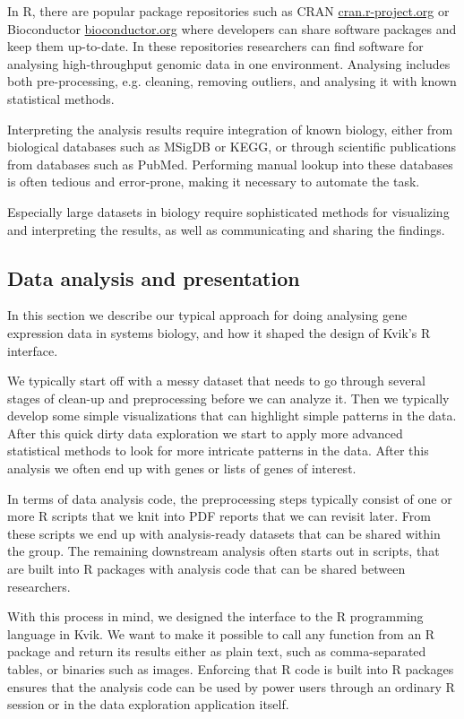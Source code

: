 In R, there are popular package repositories such as CRAN
\url{cran.r-project.org} or Bioconductor \url{bioconductor.org} where developers
can share software packages and keep them up-to-date. In these repositories
researchers can find software for analysing high-throughput genomic data in one
environment. Analysing includes both pre-processing, e.g. cleaning, removing
outliers, and analysing it with known statistical methods.

Interpreting the analysis results require integration of known biology, either
from biological databases such as MSigDB\cite{} or KEGG\cite{}, or through
scientific publications from databases such as PubMed\cite{}. Performing manual
lookup into these databases is often tedious and error-prone, making it
necessary to automate the task. %

Especially large datasets in biology require sophisticated methods for
visualizing and interpreting the results, as well as communicating and sharing
the findings.

\subsection*{Data analysis and presentation} 
In this section we describe our typical approach for doing analysing gene
expression data in systems biology, and how it shaped the design of Kvik's
R interface. 

We typically start off with a messy dataset that needs to go through
several stages of clean-up and preprocessing before we can analyze it. Then we
typically develop some simple visualizations that can highlight simple patterns
in the data. After this quick dirty data exploration we start to apply more
advanced statistical methods to look for more intricate patterns in the data.
After this analysis we often end up with genes or lists of genes of interest. 

In terms of data analysis code, the preprocessing steps typically consist of
one or more R scripts that we knit \cite{knitr} into PDF reports that we can
revisit later. From these scripts we end up with analysis-ready datasets that
can be shared within the group. The remaining downstream analysis often starts
out in scripts, that are built into R packages with analysis code that can be
shared between researchers. 

With this process in mind, we designed the interface to the R programming
language in Kvik. We want to make it possible to call any function from an R
package and return its results either as plain text, such as comma-separated
tables, or binaries such as images. Enforcing that R code is built into R
packages ensures that the analysis code can be used by power users through an
ordinary R session or in the data exploration application itself. 


